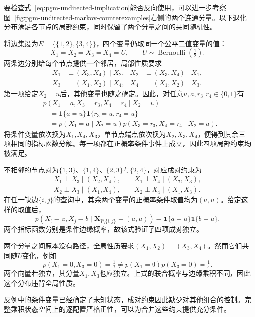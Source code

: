 要检查式~\eqref{eq:pgm-undirected-implication}能否反向使用，可以进一步考察图~\ref{fig:pgm-undirected-markov-counterexamples}右侧的两个连通分量。以下退化分布满足各节点的局部约束，同时保留了两个分量之间的共同随机性。

\begin{example}[局部、成对均不蕴含全局]
  \label{ex:pgm-undirected-local-not-global}
  将边集设为$E=\{\{1,2\},\{3,4\}\}$，四个变量仍取同一个公平二值变量的值：
  \[
    X_1=X_2=X_3=X_4=U,
    \qquad U\sim\operatorname{Bernoulli}(\tfrac12).
  \]
  两条边分别给每个节点提供一个邻居，局部性质要求
  \[
  \begin{aligned}
    X_1&\perp(X_3,X_4)\mid X_2,&
    X_2&\perp(X_3,X_4)\mid X_1,\\
    X_3&\perp(X_1,X_2)\mid X_4,&
    X_4&\perp(X_1,X_2)\mid X_3.
  \end{aligned}
  \]
  第一项给定$X_2=u$后，其他变量也随之确定。因此，对任意$u,a,r_3,r_4\in\{0,1\}$有
  \[
  \begin{aligned}
    &p(X_1=a,X_3=r_3,X_4=r_4\mid X_2=u)\\
    &\quad=\mathbf{1}\{a=u\}
            \mathbf{1}\{r_3=u,r_4=u\}\\
    &\quad=p(X_1=a\mid X_2=u)
            p(X_3=r_3,X_4=r_4\mid X_2=u).
  \end{aligned}
  \]
  将条件变量依次换为$X_1,X_4,X_3$，单节点端点依次换为$X_2,X_3,X_4$，便得到其余三项相同的指标函数分解。每一项都在正概率条件事件上成立，因此四项局部约束均被满足。

  不相邻的节点对为$\{1,3\}$、$\{1,4\}$、$\{2,3\}$与$\{2,4\}$，对应成对约束为
  \[
  \begin{gathered}
    X_1\perp X_3\mid(X_2,X_4),\qquad
    X_1\perp X_4\mid(X_2,X_3),\\
    X_2\perp X_3\mid(X_1,X_4),\qquad
    X_2\perp X_4\mid(X_1,X_3).
  \end{gathered}
  \]
  在任一缺边$\{i,j\}$的查询中，其余两个变量的正概率条件取值均为$(u,u)$。给定这样的取值后，
  \[
    p(X_i=a,X_j=b\mid\bm{X}_{V\setminus\{i,j\}}=(u,u))
    =\mathbf{1}\{a=u\}\mathbf{1}\{b=u\}.
  \]
  两个指标函数分别是条件边缘概率，故该式验证了四项成对独立。

  两个分量之间原本没有路径，全局性质要求$(X_1,X_2)\perp(X_3,X_4)$。然而它们共同随$U$变化，例如
  \[
    p(X_1=0,X_3=0)=\tfrac12
    \neq p(X_1=0)p(X_3=0)=\tfrac14.
  \]
  两个向量若独立，其分量$X_1,X_3$也应独立。上式的联合概率与边缘乘积不同，因此这个分布违背全局性质。
\end{example}

反例中的条件变量已经确定了未知状态，成对约束因此缺少对其他组合的控制。完整乘积状态空间上的逐配置严格正性，可以为合并这些约束提供充分条件。

